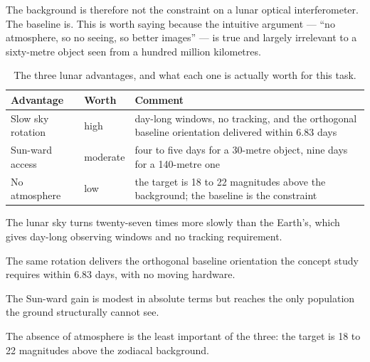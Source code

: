The background is therefore not the constraint on a lunar optical
interferometer. The baseline is. This is worth saying because the intuitive
argument --- ``no atmosphere, so no seeing, so better images'' --- is true
and largely irrelevant to a sixty-metre object seen from a hundred million
kilometres.

\begin{table}[!htbp]
\centering
\small
\caption{The three lunar advantages, and what each one is actually worth
for this task.}
\label{tab:advantages}
\begin{tabularx}{\textwidth}{@{}P{1.33in}P{1.23in}Y@{}}
\toprule
{}
\textbf{Advantage} & \textbf{Worth} & \textbf{Comment} \\
\midrule
Slow sky rotation & high & day-long windows, no tracking, and the
orthogonal baseline orientation delivered within 6.83 days \\
Sun-ward access & moderate & four to five days for a 30-metre object, nine
days for a 140-metre one \\
No atmosphere & low & the target is 18 to 22 magnitudes above the
background; the baseline is the constraint \\
\bottomrule
\end{tabularx}
\end{table}

\begin{keytakeaways}
\item The lunar sky turns twenty-seven times more slowly than the Earth's,
which gives day-long observing windows and no tracking requirement.
\item The same rotation delivers the orthogonal baseline orientation the
concept study requires within 6.83 days, with no moving hardware.
\item The Sun-ward gain is modest in absolute terms but reaches the only
population the ground structurally cannot see.
\item The absence of atmosphere is the least important of the three: the
target is 18 to 22 magnitudes above the zodiacal background.
\end{keytakeaways}
